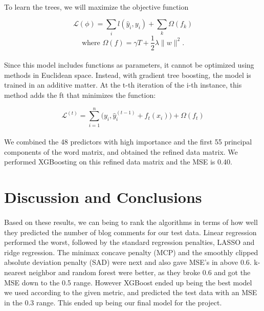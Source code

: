 \documentclass[paper=a4, fontsize=11pt]{scrartcl} %
\numberwithin{equation}{section} %
\numberwithin{figure}{section} %
\numberwithin{table}{section} %
\begin{document}
\paragraph{}
To learn the trees, we will maximize the objective function

$$\mathcal{L}(\phi) = \sum_i l(\hat{y}_i, y_i) + \sum_k \Omega( f_k )$$
$$\text{where } \Omega( f ) = \gamma T + \frac{1}{2} \lambda \| w \|^2.$$

\paragraph{}
Since this model includes functions as parameters, it cannot be optimized using methods in Euclidean space. Instead, with gradient tree boosting, the model is trained in an additive matter. At the t-th iteration of the i-th instance, this method adds the ft that minimizes the function:

$$\mathcal{L}^{(t)} = \sum_{i=1}^n \big(y_i, \hat{y}_i ^{(t-1)} + f_t (x_i)\big) + \Omega(f_t) $$

\paragraph{}
We combined the 48 predictors with high importance and the first 55 principal components of the word matrix, and obtained the refined data matrix. We performed XGBoosting on this refined data matrix and the MSE is 0.40.


%
%

\section{Discussion and Conclusions}

\paragraph{}
Based on these results, we can being to rank the algorithms in terms of how well they predicted the number of blog comments for our test data. Linear regression performed the worst, followed by the standard regression penalties, LASSO and ridge regression. The minimax concave penalty (MCP) and the smoothly clipped absolute deviation penalty (SAD) were next and also gave MSE's in above 0.6. k-nearest neighbor and random forest were better, as they broke 0.6 and got the MSE down to the 0.5 range. However XGBoost ended up being the best model we used according to the given metric, and predicted the test data with an MSE in the 0.3 range. This ended up being our final model for the project.
\end{document}

